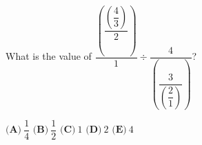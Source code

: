 What is the value of $\dfrac{\left(\dfrac{\left(\dfrac43\right)}2\right)}1\div\dfrac4{\left(\dfrac3{\left(\dfrac21\right)}\right)}$?

$\textbf{(A)}\ \dfrac14$ \qquad $\textbf{(B)}\ \dfrac12$ \qquad $\textbf{(C)}\ 1$ \qquad $\textbf{(D)}\ 2$ \qquad $\textbf{(E)}\ 4$
